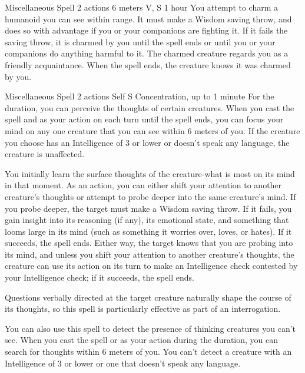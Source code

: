     {Miscellaneous Spell}
    {2 actions}
    {6 meters}
    {V, S}
    {1 hour}
    You attempt to charm a humanoid you can see within range.
    It must make a Wisdom saving throw, and does so with advantage if you or your companions are fighting it.
    If it fails the saving throw, it is charmed by you until the spell ends or until you or your companions do anything harmful to it.
    The charmed creature regards you as a friendly acquaintance.
    When the spell ends, the creature knows it was charmed by you.

    {Miscellaneous Spell}
    {2 actions}
    {Self}
    {S}
    {Concentration, up to 1 minute}
    For the duration, you can perceive the thoughts of certain creatures.
    When you cast the spell and as your action on each turn until the spell ends, you can focus your mind on any one creature that you can see within 6 meters of you.
    If the creature you choose has an Intelligence of 3 or lower or doesn't speak any language, the creature is unaffected.

    You initially learn the surface thoughts of the creature-what is most on its mind in that moment.
    As an action, you can either shift your attention to another creature's thoughts or attempt to probe deeper into the same creature's mind.
    If you probe deeper, the target must make a Wisdom saving throw.
    If it fails, you gain insight into its reasoning (if any), its emotional state, and something that looms large in its mind (such as something it worries over, loves, or hates).
    If it succeeds, the spell ends.
    Either way, the target knows that you are probing into its mind, and unless you shift your attention to another creature's thoughts, the creature can use its action on its turn to make an Intelligence check contested by your Intelligence check; if it succeeds, the spell ends.

    Questions verbally directed at the target creature naturally shape the course of its thoughts, so this spell is particularly effective as part of an interrogation.

    You can also use this spell to detect the presence of thinking creatures you can't see.
    When you cast the spell or as your action during the duration, you can search for thoughts within 6 meters of you.
    You can't detect a creature with an Intelligence of 3 or lower or one that doesn't speak any language.

